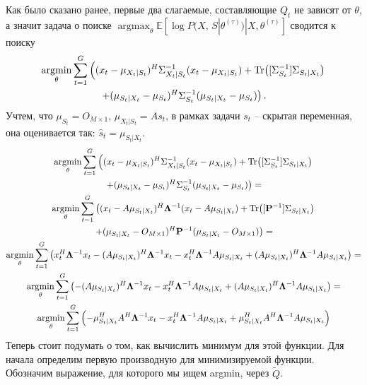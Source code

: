 \documentclass[11pt]{article}
\newcommand{\Expect}{\mathbb{E}}
\DeclareMathOperator*{\argmax}{argmax}
\DeclareMathOperator*{\argmin}{argmin}
\begin{document}
Как было сказано ранее, первые два слагаемые, составляющие $Q_t$ не зависят от $\theta$, а значит задача о поиске $\argmax_{\theta} \Expect[\log P(X, \, S|\theta^{(\tau)})|X, \theta^{(\tau)}] $ сводится к поиску
\begin{equation}
\begin{gathered}
\argmin_{\theta}  \sum_{t=1}^G \left((x_t-\mu_{X_t|S_t})^H\Sigma_{X_t|S_t}^{-1}(x_t-\mu_{X_t|S_t}) +  \Tr([\Sigma_{S_t}^{-1}]\Sigma_{S_t|X_t}) \right. \\ \left. +  (\mu_{S_t|X_t}-\mu_{S_t})^H\Sigma_{S_t}^{-1}(\mu_{S_t|X_t}-\mu_{S_t})\right).
\end{gathered}
\end{equation}
Учтем, что $\mu_{S_t} = O_{M \times 1}$, $\mu_{X_t|S_t}=As_t$, в рамках задачи $s_t$ -- скрытая переменная, она оценивается так: $\hat{s}_t = \mu_{S_t|X_t}$.
\begin{equation}
\begin{gathered}
\argmin_{\theta}  \sum_{t=1}^G \left((x_t-\mu_{X_t|S_t})^H\Sigma_{X_t|S_t}^{-1}(x_t-\mu_{X_t|S_t}) +  \Tr([\Sigma_{S_t}^{-1}]\Sigma_{S_t|X_t}) \right. \\ \left. +  (\mu_{S_t|X_t}-\mu_{S_t})^H\Sigma_{S_t}^{-1}(\mu_{S_t|X_t}-\mu_{S_t})\right) = \\
\argmin_{\theta}  \sum_{t=1}^G \left((x_t-A\mu_{S_t|X_t})^H\mathbf{\Lambda}^{-1}(x_t-A\mu_{S_t|X_t}) +  \Tr([\mathbf{P}^{-1}]\Sigma_{S_t|X_t}) \right. \\ \left. +  (\mu_{S_t|X_t}-O_{M \times 1})^H\mathbf{P}^{-1}(\mu_{S_t|X_t}-O_{M \times 1})\right) = \\
\argmin_{\theta}  \sum_{t=1}^G \left(x_t^H\mathbf{\Lambda}^{-1}x_t -(A\mu_{S_t|X_t})^H\mathbf{\Lambda}^{-1}x_t -x_t^H\mathbf{\Lambda}^{-1}A\mu_{S_t|X_t} + (A\mu_{S_t|X_t})^H\mathbf{\Lambda}^{-1}A\mu_{S_t|X_t} \right) =\\
\argmin_{\theta}  \sum_{t=1}^G \left(-(A\mu_{S_t|X_t})^H\mathbf{\Lambda}^{-1}x_t -x_t^H\mathbf{\Lambda}^{-1}A\mu_{S_t|X_t} + (A\mu_{S_t|X_t})^H\mathbf{\Lambda}^{-1}A\mu_{S_t|X_t} \right) =\\
\argmin_{\theta}  \sum_{t=1}^G \left(-\mu_{S_t|X_t}^HA^H\mathbf{\Lambda}^{-1}x_t -x_t^H\mathbf{\Lambda}^{-1}A\mu_{S_t|X_t} + \mu_{S_t|X_t}^HA^H\mathbf{\Lambda}^{-1}A\mu_{S_t|X_t} \right)
\end{gathered}
\end{equation}
Теперь стоит подумать о том, как вычислить минимум для этой функции. Для начала определим первую производную для минимизируемой функции.
Обозначим выражение, для которого мы ищем argmin, через $\tilde{Q}$. 
\end{document}
